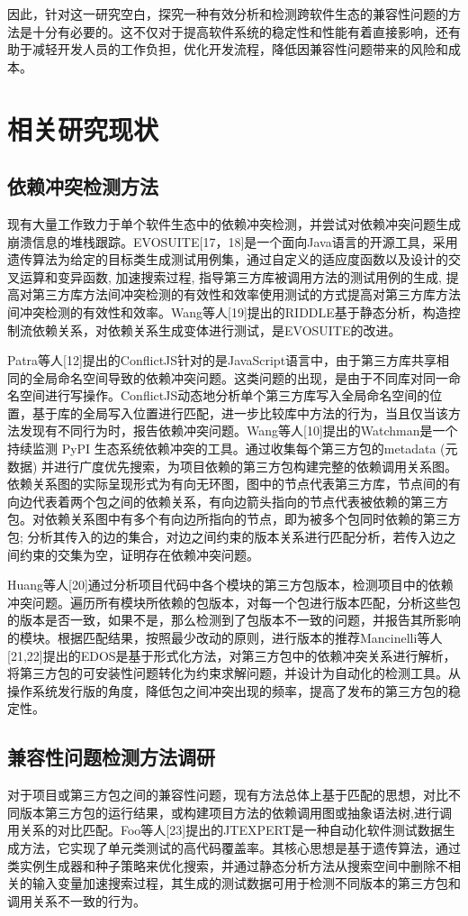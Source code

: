 因此，针对这一研究空白，探究一种有效分析和检测跨软件生态的兼容性问题的方法是十分有必要的。这不仅对于提高软件系统的稳定性和性能有着直接影响，还有助于减轻开发人员的工作负担，优化开发流程，降低因兼容性问题带来的风险和成本。


\section{相关研究现状}
\subsection{依赖冲突检测方法}
现有大量工作致力于单个软件生态中的依赖冲突检测，并尝试对依赖冲突问题生成崩溃信息的堆栈跟踪。EVOSUITE[17，18]是一个面向Java语言的开源工具，采用遗传算法为给定的目标类生成测试用例集，通过自定义的适应度函数以及设计的交叉运算和变异函数, 加速搜索过程, 指导第三方库被调用方法的测试用例的生成, 提高对第三方库方法间冲突检测的有效性和效率使用测试的方式提高对第三方库方法间冲突检测的有效性和效率。Wang等人[19]提出的RIDDLE基于静态分析，构造控制流依赖关系，对依赖关系生成变体进行测试，是EVOSUITE的改进。

Patra等人[12]提出的ConflictJS针对的是JavaScript语言中，由于第三方库共享相同的全局命名空间导致的依赖冲突问题。这类问题的出现，是由于不同库对同一命名空间进行写操作。ConflictJS动态地分析单个第三方库写入全局命名空间的位置，基于库的全局写入位置进行匹配，进一步比较库中方法的行为，当且仅当该方法发现有不同行为时，报告依赖冲突问题。Wang等人[10]提出的Watchman是一个持续监测 PyPI 生态系统依赖冲突的工具。通过收集每个第三方包的metadata (元数据) 并进行广度优先搜索，为项目依赖的第三方包构建完整的依赖调用关系图。依赖关系图的实际呈现形式为有向无环图，图中的节点代表第三方库，节点间的有向边代表着两个包之间的依赖关系，有向边箭头指向的节点代表被依赖的第三方包。对依赖关系图中有多个有向边所指向的节点，即为被多个包同时依赖的第三方包; 分析其传入的边的集合，对边之间约束的版本关系进行匹配分析，若传入边之间约束的交集为空，证明存在依赖冲突问题。

Huang等人[20]通过分析项目代码中各个模块的第三方包版本，检测项目中的依赖冲突问题。遍历所有模块所依赖的包版本，对每一个包进行版本匹配，分析这些包的版本是否一致，如果不是，那么检测到了包版本不一致的问题，并报告其所影响的模块。根据匹配结果，按照最少改动的原则，进行版本的推荐Mancinelli等人[21,22]提出的EDOS是基于形式化方法，对第三方包中的依赖冲突关系进行解析，将第三方包的可安装性问题转化为约束求解问题，并设计为自动化的检测工具。从操作系统发行版的角度，降低包之间冲突出现的频率，提高了发布的第三方包的稳定性。
\subsection{兼容性问题检测方法调研}
对于项目或第三方包之间的兼容性问题，现有方法总体上基于匹配的思想，对比不同版本第三方包的运行结果，或构建项目方法的依赖调用图或抽象语法树,进行调用关系的对比匹配。Foo等人[23]提出的JTEXPERT是一种自动化软件测试数据生成方法，它实现了单元类测试的高代码覆盖率。其核心思想是基于遗传算法，通过类实例生成器和种子策略来优化搜索，并通过静态分析方法从搜索空间中删除不相关的输入变量加速搜索过程，其生成的测试数据可用于检测不同版本的第三方包和调用关系不一致的行为。

